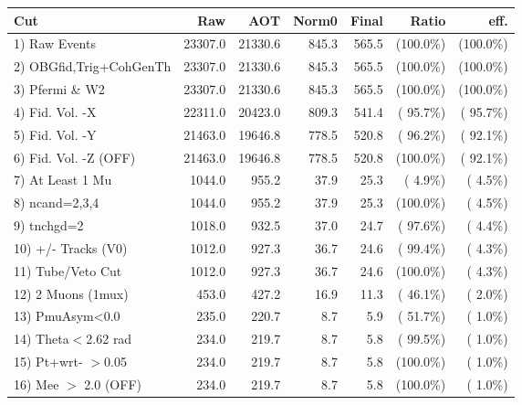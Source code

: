  \begin{table}[h!]\centering
 \begin{tabular}{||l||r|r|r|r|r|r||}
 \hline
 \hline
 Cut & Raw & AOT & Norm0 & Final & Ratio & eff.       \\
 \hline
  1) Raw Events           &      23307.0 &      21330.6 &        845.3 &        565.5 & (100.0\%) & (100.0\%) \\
  2) OBGfid,Trig+CohGenTh &      23307.0 &      21330.6 &        845.3 &        565.5 & (100.0\%) & (100.0\%) \\
  3) Pfermi \& W2         &      23307.0 &      21330.6 &        845.3 &        565.5 & (100.0\%) & (100.0\%) \\
  4) Fid. Vol. -X         &      22311.0 &      20423.0 &        809.3 &        541.4 & ( 95.7\%) & ( 95.7\%) \\
  5) Fid. Vol. -Y         &      21463.0 &      19646.8 &        778.5 &        520.8 & ( 96.2\%) & ( 92.1\%) \\
  6) Fid. Vol. -Z (OFF)   &      21463.0 &      19646.8 &        778.5 &        520.8 & (100.0\%) & ( 92.1\%) \\
  7) At Least 1 Mu        &       1044.0 &        955.2 &         37.9 &         25.3 & (  4.9\%) & (  4.5\%) \\
  8) ncand=2,3,4          &       1044.0 &        955.2 &         37.9 &         25.3 & (100.0\%) & (  4.5\%) \\
  9) tnchgd=2             &       1018.0 &        932.5 &         37.0 &         24.7 & ( 97.6\%) & (  4.4\%) \\
 10) +/- Tracks (V0)      &       1012.0 &        927.3 &         36.7 &         24.6 & ( 99.4\%) & (  4.3\%) \\
 11) Tube/Veto Cut        &       1012.0 &        927.3 &         36.7 &         24.6 & (100.0\%) & (  4.3\%) \\
 12) 2 Muons (1mux)       &        453.0 &        427.2 &         16.9 &         11.3 & ( 46.1\%) & (  2.0\%) \\
 13) PmuAsym<0.0          &        235.0 &        220.7 &          8.7 &          5.9 & ( 51.7\%) & (  1.0\%) \\
 14) Theta$<$2.62 rad     &        234.0 &        219.7 &          8.7 &          5.8 & ( 99.5\%) & (  1.0\%) \\
 15) Pt+wrt- $>$0.05      &        234.0 &        219.7 &          8.7 &          5.8 & (100.0\%) & (  1.0\%) \\
 16) Mee $>$ 2.0  (OFF)   &        234.0 &        219.7 &          8.7 &          5.8 & (100.0\%) & (  1.0\%) \\

\end{tabular}
\end{table}

